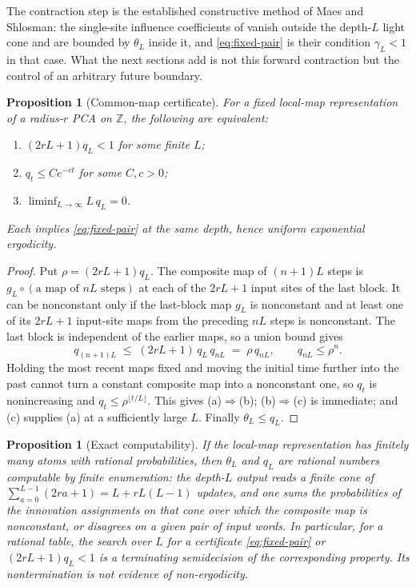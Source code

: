 \documentclass[11pt]{article}
\theoremstyle{plain}
\newtheorem{proposition}[theorem]{Proposition}
\theoremstyle{definition}
\theoremstyle{remark}
\newcommand{\Z}{\mathbb{Z}}
\begin{document}
The contraction step is the established constructive method of Maes and Shlosman: the single-site influence coefficients of \cite[Theorem~C]{MS93} vanish outside the depth-$L$ light cone and are bounded by $\theta_L$ inside it, and \eqref{eq:fixed-pair} is their condition $\gamma_L<1$ in that case. What the next sections add is not this forward contraction but the control of an arbitrary future boundary.

\begin{proposition}[Common-map certificate]
\label{prop:common-map}
For a fixed local-map representation of a radius-$r$ PCA on $\Z$, the following are equivalent:
\begin{enumerate}[label=(\alph*)]
\item $(2rL+1)q_L<1$ for some finite $L$;
\item $q_t\le Ce^{-ct}$ for some $C,c>0$;
\item $\liminf_{L\to\infty}L\,q_L=0$.
\end{enumerate}
Each implies \eqref{eq:fixed-pair} at the same depth, hence uniform exponential ergodicity.
\end{proposition}

\begin{proof}
Put $\rho=(2rL+1)q_L$. The composite map of $(n+1)L$ steps is $g_L\circ(\text{a map of } nL \text{ steps})$ at each of the $2rL+1$ input sites of the last block. It can be nonconstant only if the last-block map $g_L$ is nonconstant and at least one of its $2rL+1$ input-site maps from the preceding $nL$ steps is nonconstant. The last block is independent of the earlier maps, so a union bound gives
\[
q_{(n+1)L}\;\le\;(2rL+1)\,q_L\,q_{nL}\;=\;\rho\,q_{nL},\qquad q_{nL}\le\rho^{n}.
\]
Holding the most recent maps fixed and moving the initial time further into the past cannot turn a constant composite map into a nonconstant one, so $q_t$ is nonincreasing and $q_t\le\rho^{\lfloor t/L\rfloor}$. This gives (a)$\Rightarrow$(b); (b)$\Rightarrow$(c) is immediate; and (c) supplies (a) at a sufficiently large $L$. Finally $\theta_L\le q_L$.
\end{proof}

\begin{proposition}[Exact computability]
\label{prop:computable}
If the local-map representation has finitely many atoms with rational probabilities, then $\theta_L$ and $q_L$ are rational numbers computable by finite enumeration: the depth-$L$ output reads a finite cone of $\sum_{a=0}^{L-1}(2ra+1)=L+rL(L-1)$ updates, and one sums the probabilities of the innovation assignments on that cone over which the composite map is nonconstant, or disagrees on a given pair of input words. In particular, for a rational table, the search over $L$ for a certificate \eqref{eq:fixed-pair} or $(2rL+1)q_L<1$ is a terminating semidecision of the corresponding property. Its nontermination is not evidence of non-ergodicity.
\end{proposition}
\end{document}

